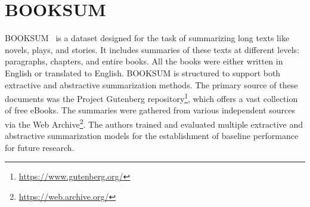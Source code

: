 \documentclass[english, ba, kiv, he, iso690numb, pdf, viewonly]{fasthesis}
\begin{document}
\section{BOOKSUM}
BOOKSUM~\cite{kryscinski2021booksum} is a dataset designed for the task of summarizing long texts like novels, plays, and stories. It includes summaries of these texts at different levels: paragraphs, chapters, and entire books. All the books were either written in English or translated to English. BOOKSUM is structured to support both extractive and abstractive summarization methods. The primary source of these documents was the Project Gutenberg repository\footnote{\url{https://www.gutenberg.org/}}, which offers a vast collection of free eBooks. The summaries were gathered from various independent sources via the Web Archive\footnote{\url{https://web.archive.org/}}. The authors trained and evaluated multiple extractive and abstractive summarization models for the establishment of baseline performance for future research.


\end{document}
